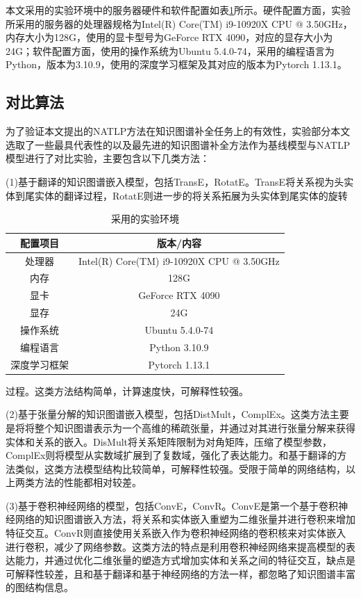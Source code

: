 本文采用的实验环境中的服务器硬件和软件配置如表\ref{environment}所示。硬件配置方面，实验所采用的服务器的处理器规格为Intel(R) Core(TM) i9-10920X CPU @ 3.50GHz，内存大小为128G，使用的显卡型号为GeForce RTX 4090，对应的显存大小为24G；软件配置方面，使用的操作系统为Ubuntu 5.4.0-74，采用的编程语言为Python，版本为3.10.9，使用的深度学习框架及其对应的版本为Pytorch 1.13.1。

\subsection{对比算法}
为了验证本文提出的NATLP方法在知识图谱补全任务上的有效性，实验部分本文选取了一些最具代表性的以及最先进的知识图谱补全方法作为基线模型与NATLP模型进行了对比实验，主要包含以下几类方法：

(1)基于翻译的知识图谱嵌入模型，包括TransE，RotatE。TransE将关系视为头实体到尾实体的翻译过程，RotatE则进一步的将关系拓展为头实体到尾实体的旋转

\begin{table}[htbp]
    \renewcommand\arraystretch{1.5}
    \caption{采用的实验环境}
    \centering
    \begin{tabular}{*{2}{c}}
      \toprule
      配置项目 & 版本/内容\\
      \midrule
      处理器  & Intel(R) Core(TM) i9-10920X CPU @ 3.50GHz \\
      内存 & 128G\\
      显卡 & GeForce RTX 4090\\
      显存 & 24G\\
      操作系统 & Ubuntu 5.4.0-74\\
      编程语言 & Python 3.10.9\\
      深度学习框架 & Pytorch 1.13.1\\
      \bottomrule
    \end{tabular}
    \label{environment}
\end{table}

\noindent
过程。这类方法结构简单，计算速度快，可解释性较强。

(2)基于张量分解的知识图谱嵌入模型，包括DistMult，ComplEx。这类方法主要是将将整个知识图谱表示为一个高维的稀疏张量，并通过对其进行张量分解来获得实体和关系的嵌入。DisMult将关系矩阵限制为对角矩阵，压缩了模型参数，ComplEx则将模型从实数域扩展到了复数域，强化了表达能力。和基于翻译的方法类似，这类方法模型结构比较简单，可解释性较强。受限于简单的网络结构，以上两类方法的性能都相对较差。
 
(3)基于卷积神经网络的模型，包括ConvE，ConvR。ConvE是第一个基于卷积神经网络的知识图谱嵌入方法，将关系和实体嵌入重塑为二维张量并进行卷积来增加特征交互。ConvR则直接使用关系嵌入作为卷积神经网络的卷积核来对实体嵌入进行卷积，减少了网络参数。这类方法的特点是利用卷积神经网络来提高模型的表达能力，并通过优化二维张量的塑造方式增加实体和关系之间的特征交互，缺点是可解释性较差，且和基于翻译和基于神经网络的方法一样，都忽略了知识图谱丰富的图结构信息。

